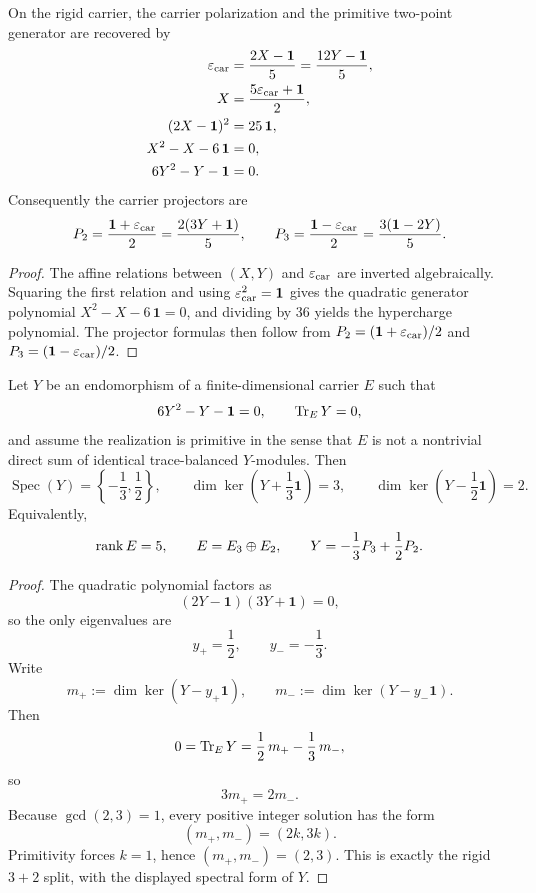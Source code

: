 \begin{lemma}
On the rigid carrier, the carrier polarization and the primitive two-point generator are recovered by
\begin{align}
\varepsilon_{\mathrm{car}}&=\frac{2X-\mathbf 1}{5}=\frac{12Y-\mathbf 1}{5},
\label{eq:hypercharge-seam-inversion}\\
\qquad
X&=\frac{5\varepsilon_{\mathrm{car}}+\mathbf 1}{2},
\nonumber\\
(2X-\mathbf 1)^2&=25\,\mathbf 1,
\nonumber\\
X^2-X-6\,\mathbf 1&=0,
\nonumber\\
6Y^2-Y-\mathbf 1&=0.
\label{eq:carrier-polynomial}
\end{align}
Consequently the carrier projectors are
\[
P_2=\frac{\mathbf 1+\varepsilon_{\mathrm{car}}}{2}=\frac{2(3Y+\mathbf 1)}{5},
\qquad
P_3=\frac{\mathbf 1-\varepsilon_{\mathrm{car}}}{2}=\frac{3(\mathbf 1-2Y)}{5}.
\]
\end{lemma}

\begin{proof}
The affine relations between $(X,Y)$ and $\varepsilon_{\mathrm{car}}$ are inverted algebraically. Squaring the first
relation and using $\varepsilon_{\mathrm{car}}^2=\mathbf 1$ gives the quadratic generator polynomial
$X^2-X-6\,\mathbf 1=0$, and dividing by $36$ yields the hypercharge polynomial. The projector
formulas then follow from $P_2=(\mathbf 1+\varepsilon_{\mathrm{car}})/2$ and $P_3=(\mathbf 1-\varepsilon_{\mathrm{car}})/2$.
\end{proof}

\begin{lemma}
\label{lem:primitive-trace-balanced-carrier}
Let $Y$ be an endomorphism of a finite-dimensional carrier $E$ such that
\[
6Y^2-Y-\mathbf 1=0,
\qquad
\operatorname{Tr}_EY=0,
\]
and assume the realization is primitive in the sense that $E$ is not a nontrivial direct sum of
identical trace-balanced $Y$-modules. Then
\[
\operatorname{Spec}(Y)=\left\{-\frac13,\frac12\right\},
\qquad
\dim\ker\!\left(Y+\frac13\mathbf 1\right)=3,
\qquad
\dim\ker\!\left(Y-\frac12\mathbf 1\right)=2.
\]
Equivalently,
\[
\operatorname{rank} E=5,
\qquad
E=E_3\oplus E_2,
\qquad
Y=-\frac13P_3+\frac12P_2.
\]
\end{lemma}

\begin{proof}
The quadratic polynomial factors as
\[
(2Y-\mathbf 1)(3Y+\mathbf 1)=0,
\]
so the only eigenvalues are
\[
y_+=\frac12,
\qquad
y_-=-\frac13.
\]
Write
\[
m_+:=\dim\ker(Y-y_+\mathbf 1),
\qquad
m_-:=\dim\ker(Y-y_-\mathbf 1).
\]
Then
\[
0=\operatorname{Tr}_EY=\frac12\,m_+-\frac13\,m_-,
\]
so
\[
3m_+=2m_-.
\]
Because $\gcd(2,3)=1$, every positive integer solution has the form
\[
(m_+,m_-)=(2k,3k).
\]
Primitivity forces $k=1$, hence $(m_+,m_-)=(2,3)$. This is exactly the rigid $3+2$ split, with
the displayed spectral form of $Y$.
\end{proof}

